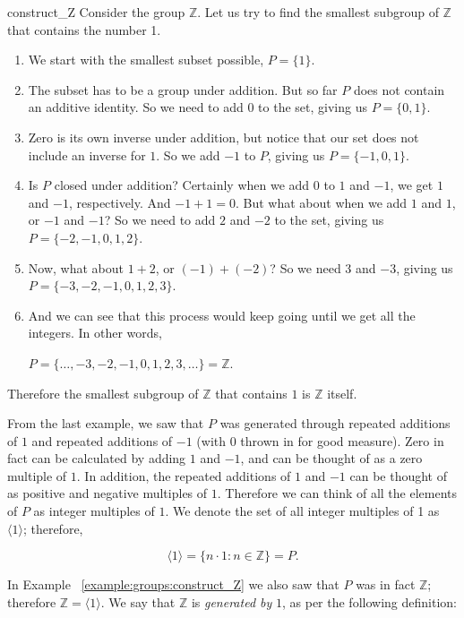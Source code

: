 \begin{example}{construct_Z}
Consider the group ${\mathbb Z}$.  Let us try to find the smallest subgroup of ${\mathbb Z}$ that contains the number 1.
\begin{enumerate}[(1)]
\item
We start with the smallest subset possible, $P = \{ 1 \}$.
\item
The subset has to be a group under addition.  But so far $P$ does not contain an additive identity.  So we need to add $0$ to the set, giving us $P = \{ 0, 1 \}$. 
\item
Zero is its own inverse under addition, but notice that our set does not include an inverse for $1$.  So we add $-1$ to $P$, giving us  $P = \{ -1, 0, 1 \}$.
\item
Is $P$ closed under addition?  Certainly when we add $0$ to $1$ and $-1$, we get $1$ and $-1$, respectively.  And $-1 + 1 = 0$.  But what about when we add $1$ and $1$, or $-1$ and $-1$?  So we need to add $2$ and $-2$ to the set, giving us $P = \{ -2, -1, 0, 1, 2 \}$.
\item
Now, what about $1 + 2$, or $(-1) + (-2)$?  So we need $3$ and $-3$, giving us $P = \{ -3, -2, -1, 0, 1, 2, 3 \}$.
\item
And we can see that this process would keep going until we get all the integers.  In other words, 

\noindent
 $P = \{ \ldots, -3, -2, -1, 0, 1, 2, 3, \ldots \} = {\mathbb Z}$.
\end{enumerate}

\noindent
Therefore the smallest subgroup of $\mathbb Z$ that contains $1$ is $\mathbb Z$ itself.
\end{example}

\noindent
From the last example, we saw that $P$ was generated through repeated additions of $1$ and  repeated additions of $-1$ (with $0$ thrown in for good measure).  
Zero in fact can be calculated by adding $1$ and $-1$, and can be thought of as a zero multiple of $1$.  In addition,  the repeated additions of $1$ and $-1$ can be thought of 
as positive and negative multiples of $1$.  Therefore we can think of all the elements of $P$ as integer multiples of $1$.  We denote the set of all integer multiples of 1 as $\langle 1 \rangle$; therefore, 

\[ \langle 1 \rangle = \{ n \cdot 1 : n \in \mathbb Z \} = P. \]

\noindent
In Example ~\ref{example:groups:construct_Z} we also saw that $P$ was in fact $\mathbb Z$; therefore $\mathbb Z = \langle 1 \rangle$. We say that $\mathbb Z$ is \emph{generated by} $1$, as per the following definition:

